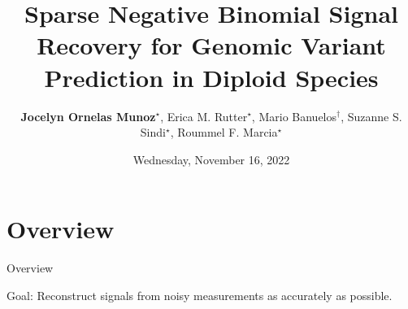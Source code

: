 \documentclass[10pt, t]{beamer}
\title[Structural Variant Detection]{Sparse Negative Binomial Signal Recovery for Genomic Variant Prediction in Diploid Species}
\author[J. Ornelas Munoz]{\textbf{Jocelyn Ornelas Munoz$^{\star}$}, Erica M. Rutter$^{\star}$, Mario Banuelos$^{\dagger}$, Suzanne S. Sindi$^{\star}$,  Roummel F. Marcia$^{\star}$}
\institute[]{\vspace{-4mm} \\ \normalsize{$^*$Department of Applied Mathematics, UC Merced\\
$^\dagger$ Department of Mathematics California State University, Fresno}\\ 	
	\vspace{2mm}
	\vspace{-3mm}
}
\date{Wednesday, November 16, 2022}
\begin{document}
\begin{frame}
  \titlepage
\end{frame}


%
%

\section{Overview}
\begin{frame}{Overview}


Goal: Reconstruct signals from noisy measurements as accurately as possible. 

\end{frame}
\end{document}

